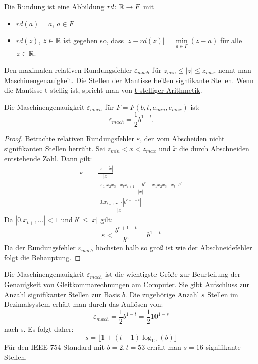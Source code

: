 \begin{definition}
Die Rundung ist eine Abbildung $rd\colon \mathbb{R} \to F $ mit 
\begin{itemize}
	\item $rd(a)=a$, $a \in F$
	\item $rd(z)$, $z \in  \mathbb{R}$ ist gegeben so, dass $|z-rd(z)|=\underset{a \in F}{\min}(z-a)$ für alle $z \in  \mathbb{R}$.
\end{itemize}
\end{definition}
\begin{definition}[Maschinengenauigkeit]
Den maximalen relativen Rundungsfehler $\varepsilon_{mach}$ für $z_{min} \le |z| \le z_{max}$ nennt man Maschinengenauigkeit.
Die Stellen der Mantisse heißen \underline{signfikante Stellen}.
Wenn die Mantisse t-stellig ist, spricht man von \underline{t-stelliger Arithmetik}.
\end{definition}
\begin{theorem}
	Die Maschinengenauigkeit $\varepsilon_{mach}$ für $F=F(b,t,e_{min},e_{max})$ ist:
	\[
	\varepsilon_{mach} = \frac{1}{2} b^{1-t} \text{.}
	\]
\end{theorem}
\begin{proof}
Betrachte relativen Rundungsfehler $\varepsilon$, der vom Abscheiden nicht signifikanten Stellen herrüht. Sei $z_{min} < x < z_{max}$ und $\tilde{x}$ die durch Abschneiden entstehende Zahl.
Dann gilt:
\begin{align*}
	\varepsilon
	&= \frac{|x-\tilde{x}|}{|x|} \\
	&= \frac{|x_1.x_2x_3 \ldots x_t x_{t+1}\ldots \cdot b^{e}-x_1x_2x_3\ldots x_t \cdot b^{e}}{|x|} \\
	&=\frac{|0.x_{t+1}\ldots| \cdot |b^{e+1-t}|}{|x|}
\end{align*}
Da $|0.x_{t+1}\ldots|<1$ und $b^{e}\le |x|$ gilt:
\[
\varepsilon <\frac{b^{e+1-t}}{b^{e}}=b^{1-t}
\]
Da der Rundungsfehler $\varepsilon_{mach}$ höchsten halb so groß ist wie der Abschneidefehler folgt die Behauptung.
\end{proof}
Die Maschinengenauigkeit $\varepsilon_{mach}$ ist die wichtigste Größe zur Beurteilung der Genauigkeit von Gleitkommarechnungen am Computer. Sie gibt Aufschluss zur Anzahl signifikanter Stellen zur Basis $b$.
Die zugehörige Anzahl $s$ Stellen im Dezimalsystem erhält man durch das Auflösen von:
\[
\varepsilon_{mach} = \frac{1}{2}b^{1-t}=\frac{1}{2}10^{1-s}
\]
nach s. Es folgt daher:
\[
s= \lfloor 1+(t-1)\log_{10}(b) \rfloor
\]
Für den IEEE 754 Standard mit $b=2, t=53$ erhält man $s=16$ signifikante Stellen.
